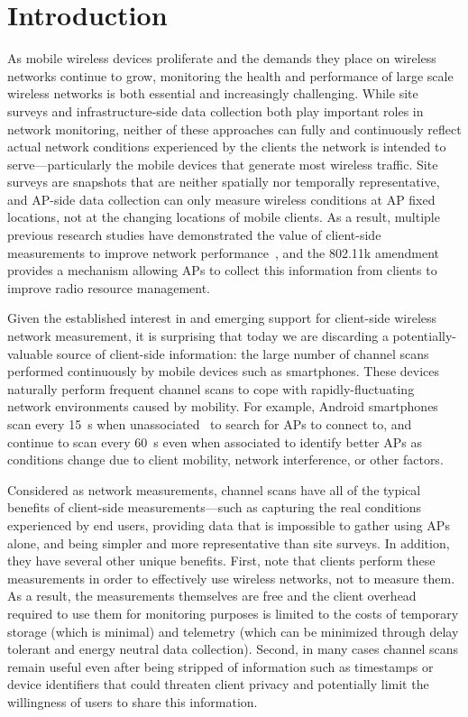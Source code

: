 \section{Introduction}
\label{sec-introduction}

As mobile wireless devices proliferate and the demands they place on wireless
networks continue to grow, monitoring the health and performance of large
scale wireless networks is both essential and increasingly challenging. While
site surveys and infrastructure-side data collection both play important
roles in network monitoring, neither of these approaches can fully and
continuously reflect actual network conditions experienced by the clients the
network is intended to serve---particularly the mobile devices that generate
most wireless traffic. Site surveys are snapshots that are neither spatially nor
temporally representative, and AP-side data collection can only
measure wireless conditions at AP fixed locations, not at the changing
locations of mobile clients. As a result, multiple previous research studies
have demonstrated the value of client-side measurements to improve network
performance~\cite{mishra2005weighted,mishra2006client}, and the 802.11k
amendment~\cite{80211k} provides a mechanism allowing APs to collect this
information from clients to improve radio resource management.

Given the established interest in and emerging support for client-side wireless
network measurement, it is surprising that today we are discarding a
potentially-valuable source of client-side information: the large number of
channel scans performed continuously by mobile devices such as smartphones.
These devices naturally perform frequent channel scans to cope with
rapidly-fluctuating network environments caused by mobility. For example,
Android smartphones scan every 15~s when unassociated~\cite{hanover2014cutting}
to search for APs to connect to, and continue to scan every 60~s even when
associated to identify better APs as conditions change due to client mobility,
network interference, or other factors.

Considered as network measurements, channel scans have all of the typical
benefits of client-side measurements---such as capturing the real conditions
experienced by end users, providing data that is impossible to gather using
APs alone, and being simpler and more representative than site surveys. In
addition, they have several other unique benefits. First, note that clients
perform these measurements in order to effectively use wireless networks, not
to measure them. As a result, the measurements themselves are free and the
client overhead required to use them for monitoring purposes is limited to
the costs of temporary storage (which is minimal) and telemetry (which can be
minimized through delay tolerant and energy neutral data collection). Second,
in many cases channel scans remain useful even after being stripped of
information such as timestamps or device identifiers that could threaten
client privacy and potentially limit the willingness of users to share this
information.

